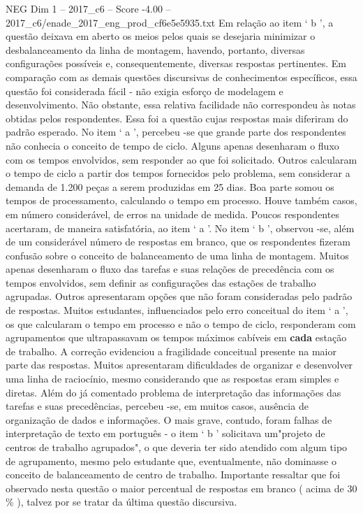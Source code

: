 \begin{textsample}{NEG Dim 1 – 2017\_c6 – Score -4.00 – 2017\_c6/enade\_2017\_eng\_prod\_cf6e5e5935.txt}
Em relação ao item ‘ b ’, a questão deixava em aberto os meios pelos quais se desejaria minimizar o desbalanceamento da linha de montagem, havendo, portanto, diversas configurações possíveis e, consequentemente, diversas respostas pertinentes.
Em comparação com as demais questões discursivas de conhecimentos específicos, essa questão foi considerada fácil - não exigia esforço de modelagem e desenvolvimento.
Não obstante, essa relativa facilidade não correspondeu às notas obtidas pelos respondentes.
Essa foi a questão cujas respostas mais diferiram do padrão esperado.
No item ‘ a ’, percebeu -se que grande parte dos respondentes não conhecia o conceito de tempo de ciclo.
Alguns apenas desenharam o fluxo com os tempos envolvidos, sem responder ao que foi solicitado.
Outros calcularam o tempo de ciclo a partir dos tempos fornecidos pelo problema, sem considerar a demanda de 1.200 peças a serem produzidas em 25 dias.
Boa parte somou os tempos de processamento, calculando o tempo em processo.
Houve também casos, em número considerável, de erros na unidade de medida.
Poucos respondentes acertaram, de maneira satisfatória, ao item ‘ a ’.
No item ‘ b ’, observou -se, além de um considerável número de respostas em branco, que os respondentes fizeram confusão sobre o conceito de balanceamento de uma linha de montagem.
Muitos apenas desenharam o fluxo das tarefas e suas relações de precedência com os tempos envolvidos, sem definir as configurações das estações de trabalho agrupadas.
Outros apresentaram opções que não foram consideradas pelo padrão de respostas.
Muitos estudantes, influenciados pelo erro conceitual do item ‘ a ’, os que calcularam o tempo em processo e não o tempo de ciclo, responderam com agrupamentos que ultrapassavam os tempos máximos cabíveis em \textbf{cada} estação de trabalho.
A correção evidenciou a fragilidade conceitual presente na maior parte das respostas.
Muitos apresentaram dificuldades de organizar e desenvolver uma linha de raciocínio, mesmo considerando que as respostas eram simples e diretas.
Além do já comentado problema de interpretação das informações das tarefas e suas precedências, percebeu -se, em muitos casos, ausência de organização de dados e informações.
O mais grave, contudo, foram falhas de interpretação de texto em português - o item ‘ b ’ solicitava um"projeto de centros de trabalho agrupados", o que deveria ter sido atendido com algum tipo de agrupamento, mesmo pelo estudante que, eventualmente, não dominasse o conceito de balanceamento de centro de trabalho.
Importante ressaltar que foi observado nesta questão o maior percentual de respostas em branco ( acima de 30 \% ), talvez por se tratar da última questão discursiva.

\end{textsample}

